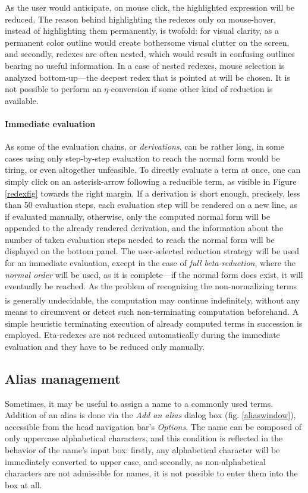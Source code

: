\documentclass[table, a4paper, 10pt]{book}
\newcommand{\cit}[1]{\textsuperscript{\cite{#1}}}
\begin{document}
As the user would anticipate, on mouse click, the highlighted expression will be reduced.
The reason behind highlighting the redexes only on mouse-hover, instead of highlighting
them permanently, is twofold: for visual clarity, as a permanent color outline would
create bothersome visual clutter on the screen, and secondly, redexes are
often nested, which would result in confusing outlines bearing no useful information.
In a case of nested redexes, mouse selection is analyzed bottom-up---the deepest 
redex that is pointed at will be chosen. It is not possible to
perform an $\eta$-conversion if some other kind of reduction is available.

\paragraph{Immediate evaluation}
As some of the evaluation chains, or \textit{derivations},
can be rather long, in some cases using
only step-by-step evaluation to reach the normal form would be tiring, or even altogether unfeasible.
To directly evaluate a term at once, one can simply click on an asterisk-arrow following
a reducible term, as visible in Figure \ref{redexfig} towards the right margin.
If a derivation is short enough, precisely, less than 50 evaluation steps,
each evaluation step will be rendered on a new line, as if evaluated manually,
otherwise, only the computed normal form
will be appended to the already rendered derivation, and the information
about the number of taken evaluation steps needed to reach the normal form will be
displayed on the bottom panel. The user-selected reduction strategy 
will be used for an immediate evaluation, except in the case of \textit{full beta-reduction}, where the
\textit{normal order} will be used, as it is complete---if the normal form does
exist, it will eventually be reached.
As the problem of recognizing the non-normalizing terms is generally undecidable,\cit{zlatuska}
the computation may continue indefinitely, without any means
to circumvent or detect such non-terminating computation beforehand.
A simple heuristic terminating execution
of already computed terms in succession is employed.
Eta-redexes are not reduced automatically during the immediate evaluation and they
have to be reduced only manually.

\subsection{Alias management}
Sometimes, it may be useful to assign a name to a commonly used terms. 
Addition of an alias is done via the \textit{Add an alias} dialog box (fig. \ref{aliaswindow}),
accessible from the head navigation bar's \textit{Options}.
The name can be composed of only uppercase alphabetical characters,
and this condition is
reflected in the behavior of the name's input box: firstly, any alphabetical character
will be immediately converted to upper case, and secondly, as non-alphabetical characters
are not admissible for names, it is not possible to enter them into the box at all.
\end{document}
